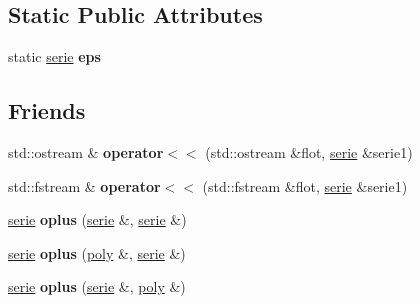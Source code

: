 \subsection*{Static Public Attributes}
\begin{DoxyCompactItemize}
\item 
\mbox{\label{classmmgd_1_1serie_a5b098609ed451a16502695db01e95543}} 
static \mbox{\hyperlink{classmmgd_1_1serie}{serie}} {\bfseries eps}
\end{DoxyCompactItemize}
\subsection*{Friends}
\begin{DoxyCompactItemize}
\item 
\mbox{\label{classmmgd_1_1serie_ab5c16b5ec4f47cf21bc40d7a8ed334ba}} 
std\+::ostream \& {\bfseries operator$<$$<$} (std\+::ostream \&flot, \mbox{\hyperlink{classmmgd_1_1serie}{serie}} \&serie1)
\item 
\mbox{\label{classmmgd_1_1serie_aa30553ecd514ac08baab9da517a1634b}} 
std\+::fstream \& {\bfseries operator$<$$<$} (std\+::fstream \&flot, \mbox{\hyperlink{classmmgd_1_1serie}{serie}} \&serie1)
\item 
\mbox{\label{classmmgd_1_1serie_a5cdfc5f944baf6a0d58154edf0289bd7}} 
\mbox{\hyperlink{classmmgd_1_1serie}{serie}} {\bfseries oplus} (\mbox{\hyperlink{classmmgd_1_1serie}{serie}} \&, \mbox{\hyperlink{classmmgd_1_1serie}{serie}} \&)
\item 
\mbox{\label{classmmgd_1_1serie_a8cefe99b16b97b3b2259c1a7a41bdec2}} 
\mbox{\hyperlink{classmmgd_1_1serie}{serie}} {\bfseries oplus} (\mbox{\hyperlink{classmmgd_1_1poly}{poly}} \&, \mbox{\hyperlink{classmmgd_1_1serie}{serie}} \&)
\item 
\mbox{\label{classmmgd_1_1serie_a785a2830a23c8b9df7fbd48a063d3233}} 
\mbox{\hyperlink{classmmgd_1_1serie}{serie}} {\bfseries oplus} (\mbox{\hyperlink{classmmgd_1_1serie}{serie}} \&, \mbox{\hyperlink{classmmgd_1_1poly}{poly}} \&)
\item 
\mbox{\label{classmmgd_1_1serie_a1e07a6e300fb9cbe0d6852e497b3cf2f}} 

\end{DoxyCompactItemize}
